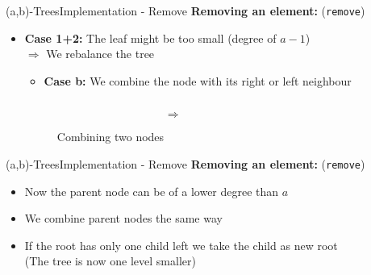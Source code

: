 \begin{frame}{(a,b)-Trees}{Implementation - Remove}
  \textbf{Removing an element:} (\texttt{\color{Mittel-Blau}remove})
  \begin{itemize}
    \item
      \textbf{Case 1+2:}
      The leaf might be too small (degree of {\color{Mittel-Blau}$a-1$})\\
      $\Rightarrow$ We {\color{Mittel-Blau}rebalance} the tree
      \vspace{0.5em}
      \begin{itemize}
        \item
          \textbf{Case b:}
          We {\color{Mittel-Blau}combine} the node with its right or left
          neighbour
      \end{itemize}
      \begin{figure}
        \begin{columns}
          \begin{column}{0.45\linewidth}
            \begin{adjustbox}{width=\linewidth}
              
            \end{adjustbox}
          \end{column}
          \begin{column}{0.1\linewidth}
            \begin{center}
              $\Rightarrow$
            \end{center}
          \end{column}
          \begin{column}{0.45\linewidth}
            \begin{adjustbox}{width=0.85\linewidth}
              
            \end{adjustbox}
          \end{column}
        \end{columns}
        \caption{Combining two nodes}
        \label{fig:a_b_tree:merge}
      \end{figure}
  \end{itemize}
\end{frame}


\begin{frame}{(a,b)-Trees}{Implementation - Remove}
  \textbf{Removing an element:} (\texttt{\color{Mittel-Blau}remove})
  \begin{itemize}
    \item
      Now the parent node can be of a lower degree than
      {\color{Mittel-Blau}$a$}
    \item
      We {\color{Mittel-Blau}combine} parent nodes the same way
    \item
      If the root has only one child left we take the child as new root\\
      (The tree is now one level smaller)
  \end{itemize}
\end{frame}

